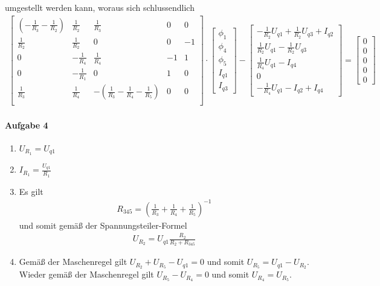 \documentclass{article}
\begin{document}
umgestellt werden kann, woraus sich schlussendlich
\begin{align*}
    \begin{bmatrix}
        \left(-\frac{1}{R_3} - \frac{1}{R_2}\right) & \frac{1}{R_2} & \frac{1}{R_3} & 0 & 0 \\
        \frac{1}{R_2} & \frac{1}{R_2} & 0 & 0 & -1 \\
        0 & - \frac{1}{R_4} & \frac{1}{R_4} & -1 & 1 \\
        0 & -\frac{1}{R_1}  & 0 & 1 & 0 \\
        \frac{1}{R_3} & \frac{1}{R_4} & - \left(\frac{1}{R_3} - \frac{1}{R_4} - \frac{1}{R_5}\right) & 0 & 0 \\
    \end{bmatrix}
    \cdot
    \begin{bmatrix}
        \phi_1 \\
        \phi_4 \\
        \phi_5 \\
        I_{q1} \\
        I_{q3}
    \end{bmatrix}
    -
    \begin{bmatrix}
        -\frac{1}{R_2}U_{q1} + \frac{1}{R_2}U_{q3} + I_{q2} \\
        \frac{1}{R_2}U_{q1} - \frac{1}{R_2}U_{q3} \\
        \frac{1}{R_4}U_{q1} - I_{q4} \\
        0 \\
        -\frac{1}{R_4}U_{q1} - I_{q2} + I_{q4}
    \end{bmatrix}
    =
    \begin{bmatrix}
        0 \\ 0 \\ 0 \\ 0 \\ 0
    \end{bmatrix}
\end{align*}

\paragraph{Aufgabe 4}

\begin{enumerate}
    \item $U_{R_1} = U_{q1}$
    \item $I_{R_1} = \frac{U_{q1}}{R_1}$
    
    \item Es gilt
    \begin{align*}
        R_{345} = \left(\frac{1}{R_3} + \frac{1}{R_4} + \frac{1}{R_5}\right)^{-1}
    \end{align*}
    und somit gem\"a{\ss} der Spannungsteiler-Formel
    \begin{align*}
        U_{R_2} = U_{q1}\frac{R_2}{R_2 + R_{345}}
    \end{align*}

    \item Gem\"a{\ss} der Maschenregel gilt $U_{R_2} + U_{R_5} - U_{q1} = 0$ und somit $U_{R_5} =  U_{q1} - U_{R_2}$. Wieder gem\"a{\ss} der Maschenregel gilt $U_{R_5} - U_{R_4} = 0$ und somit $U_{R_4} = U_{R_5}$.
\end{enumerate}
\end{document}
